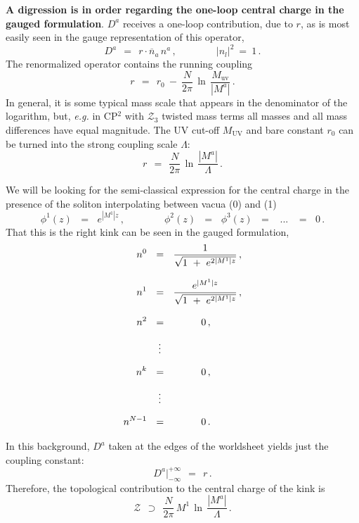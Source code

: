 \documentclass[epsfig,12pt]{article}
\def\beq{\begin{equation}}
\def\eeq{\end{equation}}
\def\beq{\begin{equation}}
\def\eeq{\end{equation}}
\newcommand{\ov}{\overline}
\newcommand{\mc}[1]{\mathcal{#1}}
\begin{document}
 
 
{\bf A digression is in order regarding the one-loop central charge in the gauged formulation}.
 $ D^a $ receives a one-loop contribution, due to $ r $, as is 
       most easily seen in the gauge representation of this operator,
\beq
       D^a  ~~=~~ r \cdot \ov{n}{}_a\, n^a \,,\qquad\qquad   | n_l |^2 ~=~ 1\,.
\eeq
       The renormalized operator contains the running coupling 
\beq
       r    ~~=~~ r_0  ~-~ \frac{N}{2\pi}\,\ln\, \frac{M_\text{uv}}
                                                      {   |M^a|   } \,.
\eeq
       In general, it is some typical mass scale that appears in the denominator of the logarithm, but, {\it e.g.}
       in CP$^2$ with $\mc{Z}_3$ twisted mass terms all masses and all mass differences have equal magnitude. 
       The UV cut-off $ M_\text{UV} $ and bare constant $ r_0 $ can be turned 
       into the strong coupling scale $ \Lambda $:
\beq
       r    ~~=~~ \frac{N}{2\pi}\, \ln\, \frac{   |M^a|   }
                                              {  \Lambda  }\,.
\eeq


       We will be looking for the semi-classical expression for the central charge in the presence
       of the soliton interpolating between vacua ({\sc \small 0}) and ({\sc \small 1})
\beq
       \phi^1(z)  \,~~=~~\, e^{|M^1| z}\,, \qquad\qquad  \phi^2(z) \,~~=~~\, \phi^3(z) \,~~=~~ \,~...~\, ~~=~~\, 0\,.
\eeq
       That this is the right kink can be seen in the gauged formulation,
\begin{align}
%
\notag
       n^0  & ~~=~~ \frac {             1              }
                          {\sqrt{ 1 ~+~ e^{2 |M^1| z} }}\,, \\[3mm]
%
\notag
       n^1  & ~~=~~ \frac {         e^{|M^1| z}        }
                          {\sqrt{ 1 ~+~ e^{2 |M^1| z} }}\,, \\[3mm]
%
\notag
       n^2  & ~~=~~ \qquad~~\, 0\,,  \\[2mm]
%	 
            & ~~~\,\vdots          \\[2mm]
%
\notag
       n^k  & ~~=~~ \qquad~~\, 0\,,  \\[2mm]
%	 
\notag
            & ~~~\,\vdots          \\[2mm]
%
\notag
       n^{N-1} & ~~=~~ \qquad~~\, 0\,.                
\end{align}

       In this background, $ D^a $ taken at the edges of the worldsheet yields just the coupling constant:
\beq
       D^a \Big|^{\scriptscriptstyle +\infty}_{\scriptscriptstyle -\infty} ~~=~~    r\,.
\eeq
       Therefore, the topological contribution to the central charge of the kink is
\beq
       \mc{Z} ~~\supset~~ \frac{N}{2\pi}\, M^1\, \ln\, \frac{   |M^a|   }
                                                            {  \Lambda  }\,.
\eeq
\end{document}
